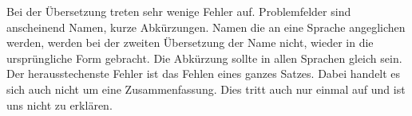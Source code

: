 Bei der Übersetzung treten sehr wenige Fehler auf. Problemfelder sind anscheinend Namen, kurze Abkürzungen. Namen die an eine Sprache angeglichen werden, werden bei der zweiten Übersetzung der Name nicht, wieder in die ursprüngliche Form gebracht. Die Abkürzung sollte in allen Sprachen gleich sein. Der herausstechenste Fehler ist das Fehlen eines ganzes Satzes. Dabei handelt es sich auch nicht um eine Zusammenfassung. Dies tritt auch nur einmal auf und ist uns nicht zu erklären.